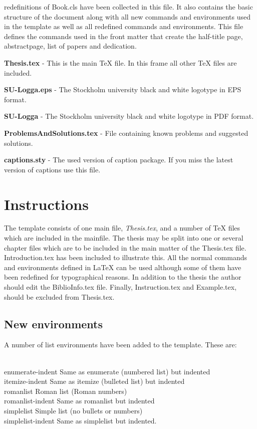 \begin{simplelist}
      redefinitions of Book.cls have been collected in this
      file. It also contains the basic structure of the document
      along with all new commands and environments used in the
      template as well as all redefined commands and
      environments. This file defines the commands used in the
      front matter that create the half-title page, abstractpage,
      list of papers and dedication.    
    \item \textbf{Thesis.tex} - This is the main \TeX{} file. In
      this frame all other \TeX{} files are included. 
    \item \textbf{SU-Logga.eps} - The Stockholm university black
      and white logotype in EPS format. 
    \item \textbf{SU-Logga} - The Stockholm university black and
      white logotype in PDF format. 
    \item \textbf{ProblemsAndSolutions.tex} - File containing
      known problems and suggested solutions. 
    \item \textbf{captions.sty} - The used version of caption
      package. If you miss the latest version of captions use this
      file. 
\end{simplelist}

\section{Instructions}
The template consists of one main file, \emph{Thesis.tex}, and a
number of \TeX{} files which are included in the mainfile. The
thesis may be split into one or several chapter files which are to
be included in the main matter of the Thesis.tex
file. Introduction.tex has been included to illustrate this. All
the normal commands and environments defined in \LaTeX{} can be
used although some of them have been redefined for typographical
reasons. In addition to the thesis the author should edit the
BiblioInfo.tex file. Finally, Instruction.tex and Example.tex,
should be excluded from Thesis.tex. 

\subsection{New environments}
A number of list environments have been added to the
template. These are: 
\begin{tabbing}
\hspace{4cm}\=\\
enumerate-indent \> Same as enumerate (numbered list) but
indented\\ 
itemize-indent \> Same as itemize (bulleted list) but indented\\ 
romanlist \> Roman list (Roman numbers)\\
romanlist-indent \> Same as romanlist but indented\\
simplelist \> Simple list (no bullets or numbers)\\
simplelist-indent \> Same as simplelist but indented.
\end{tabbing}


